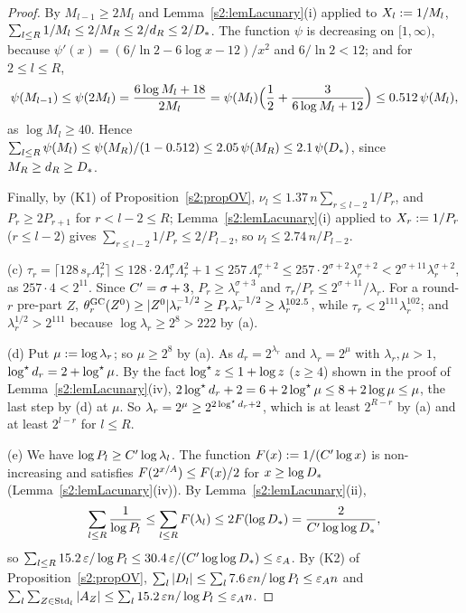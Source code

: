 \begin{proof}
By $M_{l-1}\ge2M_l$ and Lemma~\ref{s2:lemLacunary}(i) applied to $X_l\mathrel{:=}
1/M_l$, $\sum_{l\le R}1/M_l\le2/M_R\le2/d_R\le2/D_{*}$. The function $\psi$ is
decreasing on $[1,\infty)$, because $\psi'(x)=(6/\ln2-6\log x-12)/x^2$ and
$6/\ln2<12$; and for $2\le l\le R$,
\[
\psi(M_{l-1})\le\psi(2M_l)=\frac{6\log M_l+18}{2M_l}
=\psi(M_l)\Bigl(\frac12+\frac3{6\log M_l+12}\Bigr)\le0.512\,\psi(M_l),
\]
as $\log M_l\ge40$. Hence $\sum_{l\le R}\psi(M_l)\le\psi(M_R)/(1-0.512)\le
2.05\,\psi(M_R)\le2.1\,\psi(D_{*})$, since $M_R\ge d_R\ge D_{*}$.

Finally, by (K1) of Proposition~\ref{s2:propOV},
$\nu_l\le1.37\,n\sum_{r\le l-2}1/P_r$, and $P_r\ge2P_{r+1}$ for $r<l-2\le R$;
Lemma~\ref{s2:lemLacunary}(i) applied to $X_r\mathrel{:=}1/P_r$ ($r\le l-2$) gives
$\sum_{r\le l-2}1/P_r\le2/P_{l-2}$, so $\nu_l\le2.74\,n/P_{l-2}$.

(c) $\tau_r=\lceil128\,s_r\Lambda_r^2\rceil\le128\cdot2\Lambda_r^\sigma
\Lambda_r^2+1\le257\,\Lambda_r^{\sigma+2}\le257\cdot2^{\sigma+2}
\lambda_r^{\sigma+2}<2^{\sigma+11}\lambda_r^{\sigma+2}$, as $257\cdot4<2^{11}$.
Since $C'=\sigma+3$, $P_r\ge\lambda_r^{\sigma+3}$ and
$\tau_r/P_r\le2^{\sigma+11}/\lambda_r$. For a round-$r$ pre-part $Z$,
$\theta^{\mathrm{GC}}_r(Z^0)\ge|Z^0|\lambda_r^{-1/2}\ge P_r\lambda_r^{-1/2}\ge
\lambda_r^{102.5}$, while $\tau_r<2^{111}\lambda_r^{102}$; and
$\lambda_r^{1/2}>2^{111}$ because $\log\lambda_r\ge2^8>222$ by (a).

(d) Put $\mu\mathrel{:=}\log\lambda_r$; so $\mu\ge2^8$ by (a). As $d_r=2^{\lambda_r}$ and
$\lambda_r=2^\mu$ with $\lambda_r,\mu>1$, $\log^{\star} d_r=2+\log^{\star}\mu$. By the fact
$\log^{\star} z\le1+\log z$ ($z\ge4$) shown in the proof of
Lemma~\ref{s2:lemLacunary}(iv), $2\log^{\star} d_r+2=6+2\log^{\star}\mu\le8+2\log\mu\le\mu$,
the last step by (d) at $\mu$.
So $\lambda_r=2^\mu\ge2^{2\log^{\star} d_r+2}$, which is at least $2^{R-r}$ by (a) and
at least $2^{l-r}$ for $l\le R$.

(e) We have $\log P_l\ge C'\log\lambda_l$. The function
$F(x)\mathrel{:=}1/(C'\log x)$ is non-increasing and satisfies
$F(2^{x/A})\le F(x)/2$ for $x\ge\log D_{*}$
(Lemma~\ref{s2:lemLacunary}(iv)). By Lemma~\ref{s2:lemLacunary}(ii),
\[
\sum_{l\le R}\frac1{\log P_l}\le\sum_{l\le R}F(\lambda_l)\le2F(\log D_{*})=
\frac2{C'\log\log D_{*}},
\]
so $\sum_{l\le R}15.2\,\varepsilon/\log P_l\le30.4\,\varepsilon/(C'\log\log D_{*})\le
\varepsilon_{A}$. By (K2) of Proposition~\ref{s2:propOV},
$\sum_l|D_l|\le\sum_l7.6\,\varepsilon n/\log P_l\le\varepsilon_{A} n$ and
$\sum_l\sum_{Z\in\mathrm{Std}_l}|A_Z|\le\sum_l15.2\,\varepsilon n/\log P_l\le\varepsilon_{A} n$.
\end{proof}

